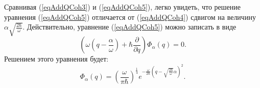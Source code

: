 Сравнивая (\ref{eqAddQCoh3}) и (\ref{eqAddQCoh5}), легко увидеть, что
решение уравнения (\ref{eqAddQCoh5}) отличается от (\ref{eqAddQCoh4})
сдвигом на величину
$\alpha\sqrt{\frac{2\hbar}{\omega}}$. Действительно, уравнение
(\ref{eqAddQCoh5}) можно записать в виде
\begin{equation}
\left(
\omega \left(q - \frac{\alpha}{\omega}\right) + \hbar \frac{\partial}{\partial q}
\right) \Phi_{\alpha}\left(q\right) = 0.
\nonumber
\end{equation}
Решением этого уравнения будет:
\begin{equation}
\Phi_{\alpha}\left(q\right) = \left(\frac{\omega}{\pi
  \hbar}\right)^{\frac{1}{4}} e^{-\frac{\omega}{2
    \hbar}\left(q-\sqrt{\frac{2\hbar}{\omega}}\alpha\right)^2}. 
\label{eqAddQCoh7}
\end{equation}


